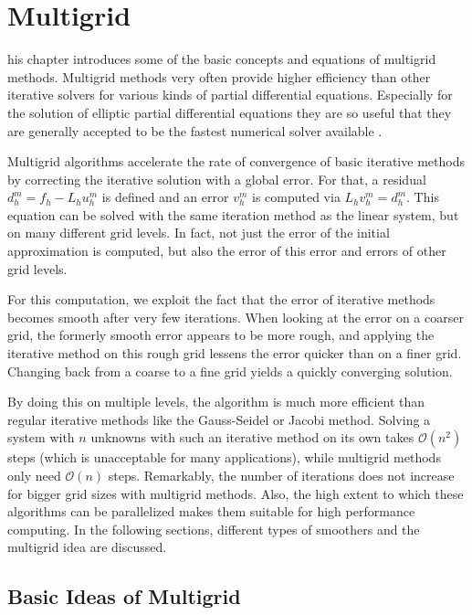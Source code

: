 %
%
\let\textcircled=\pgftextcircled
\chapter{Multigrid}
\label{chap:multigrid}
his chapter introduces some of the basic concepts and equations of multigrid methods. Multigrid methods very often provide higher efficiency than other iterative solvers for various kinds of partial differential equations. Especially for the solution of elliptic partial differential equations they are so useful  that they are generally accepted to be the fastest numerical solver available \cite{Trottenberg:2000:MUL:374106}.

Multigrid algorithms accelerate the rate of convergence of basic iterative methods by correcting the iterative solution with a global error. For that, a residual $d_h^m = f_h - L_h u_h^m$ is defined and an error $v_h^m$ is computed via $L_h v_h^m = d_h^m$. This equation can be solved with the same iteration method as the linear system, but on many different grid levels. In fact, not just the error of the initial approximation is computed, but also the error of this error and errors of other grid levels. 

For this computation, we exploit the fact that the error of iterative methods becomes smooth after very few iterations. When looking at the error on a coarser grid, the formerly smooth error appears to be more rough, and applying the iterative method on this rough grid lessens the error quicker than on a finer grid. Changing back from a coarse to a fine grid yields a quickly converging solution. 

By doing this on multiple levels, the algorithm is much more efficient than regular iterative methods like the Gauss-Seidel or Jacobi method. Solving a system with $n$ unknowns with such an iterative method on its own takes $\mathcal{O}(n^2)$ steps (which is unacceptable for many applications), while multigrid methods only need $\mathcal{O}(n)$ steps. Remarkably, the number of iterations does not increase for bigger grid sizes with multigrid methods. Also, the high extent to which these algorithms can be parallelized makes them suitable for high performance computing. In the following sections, different types of smoothers and the multigrid idea are discussed. 

\section{Basic Ideas of Multigrid}

